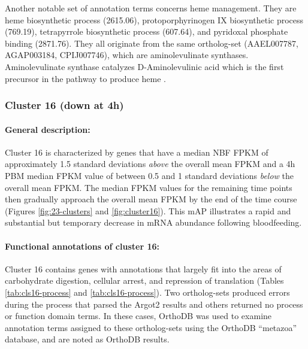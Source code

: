 Another notable set of annotation terms concerns heme management.
%
They are heme biosynthetic process (2615.06), protoporphyrinogen IX biosynthetic process (769.19), tetrapyrrole biosynthetic process (607.64), and pyridoxal phosphate binding (2871.76).
%
They all originate from the same ortholog-set (AAEL007787, AGAP003184, CPIJ007746), which are aminolevulinate synthases.
%
Aminolevulinate synthase catalyzes D-Aminolevulinic acid which is the first precursor in the pathway to produce heme \cite{Layer2010}.



 

\subsubsection{Cluster 16 (down at 4h)}

\paragraph*{General description:}

Cluster 16 is characterized by genes that have a median \gls{NBF} \gls{FPKM} of approximately 1.5 standard deviations \textit{above} the overall mean \gls{FPKM} and a 4h \gls{PBM} median \gls{FPKM} value of between 0.5 and 1 standard deviations \textit{below} the overall mean \gls{FPKM}. The median \gls{FPKM} values for the remaining time points then gradually approach the overall mean \gls{FPKM} by the end of the time course (Figures \ref{fig:23-clusters} and \ref{fig:cluster16}).
%
This \gls{mAP} illustrates a rapid and substantial but temporary decrease in mRNA abundance following bloodfeeding.
%



\paragraph*{Functional annotations of cluster 16:}


Cluster 16 contains genes with annotations that largely fit into the areas of carbohydrate digestion, cellular arrest, and repression of translation (Tables \ref{tab:cls16-process} and \ref{tab:cls16-process}).
%
Two ortholog-sets produced errors during the process that parsed the \gls{Argot2} results and others returned no process or function domain terms.
%
In these cases, OrthoDB was used to examine annotation terms assigned to these ortholog-sets using the OrthoDB ``metazoa'' database, and are noted as OrthoDB results.

